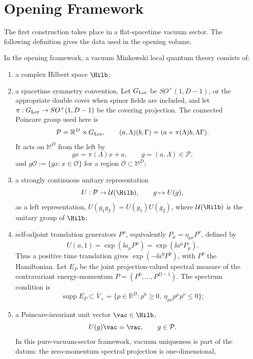 \section{Opening Framework}

The first construction takes place in a flat-spacetime vacuum sector. The
following definition gives the data used in the opening volume.

\begin{definition}
\label{def:vacuum-minkowski-local-qft}
In the opening framework, a vacuum Minkowski local quantum theory consists of:
\begin{enumerate}
  \item a complex Hilbert space \(\Hilb\);
  \item a spacetime symmetry convention.  Let \(G_{\rm Lor}\) be
  \(SO^+(1,D-1)\), or the appropriate double cover when spinor fields are
  included, and let
  \(\pi:G_{\rm Lor}\to SO^+(1,D-1)\) be the covering projection.  The connected
  Poincare group used here is
  \[
    \mathcal P=\mathbb R^D\rtimes G_{\rm Lor},
    \qquad
    (a,\Lambda)(b,\Gamma)
    =
    (a+\pi(\Lambda)b,\Lambda\Gamma).
  \]
  It acts on \(\mathbb M^D\) from the left by
  \[
    g x=\pi(\Lambda)x+a,
    \qquad g=(a,\Lambda)\in\mathcal P,
  \]
  and \(g\mathcal O:=\{gx:x\in\mathcal O\}\) for a region
  \(\mathcal O\subset\mathbb M^D\);
  \item a strongly continuous unitary representation
  \[
    U:\mathcal P\to\mathcal U(\Hilb),
    \qquad
    g\mapsto U(g),
  \]
  as a left representation, \(U(g_1g_2)=U(g_1)U(g_2)\), where
  \(\mathcal U(\Hilb)\) is the unitary group of \(\Hilb\);
  \item self-adjoint translation generators \(P^\mu\), equivalently
  \(P_\mu=\eta_{\mu\nu}P^\nu\), defined by
  \[
    U(a,1)=\exp(\ii a_\mu P^\mu)=\exp(\ii a^\mu P_\mu).
  \]
  Thus a positive time translation gives
  \(\exp(-\ii a^0P^0)\), with \(P^0\) the Hamiltonian.  Let \(E_P\) be the
  joint projection-valued spectral measure of the contravariant
  energy-momentum \(P=(P^0,\ldots,P^{D-1})\).  The spectrum condition is
  \[
    \operatorname{supp}E_P\subset
    \overline V_+
    =
    \{p\in\mathbb R^D:p^0\ge0,\ \eta_{\mu\nu}p^\mu p^\nu\le0\};
  \]
  \item a Poincare-invariant unit vector \(\vac\in\Hilb\),
  \[
    U(g)\vac=\vac,\qquad g\in\mathcal P.
  \]
  In this pure-vacuum-sector framework, vacuum uniqueness is part of the
  datum: the zero-momentum spectral projection is one-dimensional,

\end{enumerate}
\end{definition}
